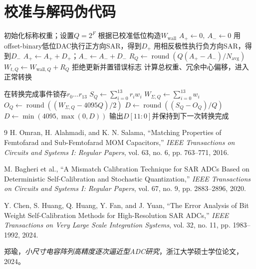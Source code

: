 \documentclass[UTF8,a4paper,11pt]{ctexart}
\newcommand{\round}{\operatorname{round}}
\begin{document}
\section{校准与解码伪代码}

\begin{algorithm}[H]
\caption{高三位bottom-up前景校准}
\begin{algorithmic}[1]
\State 初始化标称权重；设置$Q=2^F$
  \State 根据已校准低位构造$W_{\mathrm{wall}}$
  \State $A_+\gets0,\ A_-\gets0$
    \State 用offset-binary低位DAC执行正方向SAR，得到$D_+$
    \State 用相反极性执行负方向SAR，得到$D_-$
    \State $A_+\gets A_++D_+$；$A_-\gets A_-+D_-$
  \EndFor
  \State $R_Q\gets\round\left(Q(A_+-A_-)/N_{\mathrm{avg}}\right)$
  \State $W_{t,Q}\gets W_{\mathrm{wall},Q}+R_Q$
    \State 拒绝更新并置错误标志
  \EndIf
\EndFor
\State 计算总权重、冗余中心偏移，进入正常转换
\end{algorithmic}
\end{algorithm}

\begin{algorithm}[H]
\caption{14判决到12位校准码}
\begin{algorithmic}[1]
\State 在转换完成事件锁存$r_0\ldots r_{13}$
\State $S_Q\gets\sum_{i=0}^{13}r_iw_i$
\State $W_{\Sigma,Q}\gets\sum_{i=0}^{13}w_i$
\State $O_Q\gets\round((W_{\Sigma,Q}-4095Q)/2)$
\State $D\gets\round((S_Q-O_Q)/Q)$
\State $D\gets\min(4095,\max(0,D))$
\State 输出$D[11:0]$并保持到下一次转换完成
\end{algorithmic}
\end{algorithm}

\begin{thebibliography}{9}
H. Omran, H. Alahmadi, and K. N. Salama,
``Matching Properties of Femtofarad and Sub-Femtofarad MOM Capacitors,''
\emph{IEEE Transactions on Circuits and Systems I: Regular Papers},
vol. 63, no. 6, pp. 763--771, 2016.

M. Bagheri et al.,
``A Mismatch Calibration Technique for SAR ADCs Based on Deterministic Self-Calibration and Stochastic Quantization,''
\emph{IEEE Transactions on Circuits and Systems I: Regular Papers},
vol. 67, no. 9, pp. 2883--2896, 2020.

Y. Chen, S. Huang, Q. Huang, Y. Fan, and J. Yuan,
``The Error Analysis of Bit Weight Self-Calibration Methods for High-Resolution SAR ADCs,''
\emph{IEEE Transactions on Very Large Scale Integration Systems},
vol. 32, no. 11, pp. 1983--1992, 2024.

郑瑜，\emph{小尺寸电容阵列高精度逐次逼近型ADC研究}，浙江大学硕士学位论文，2024。
\end{thebibliography}
\end{document}
